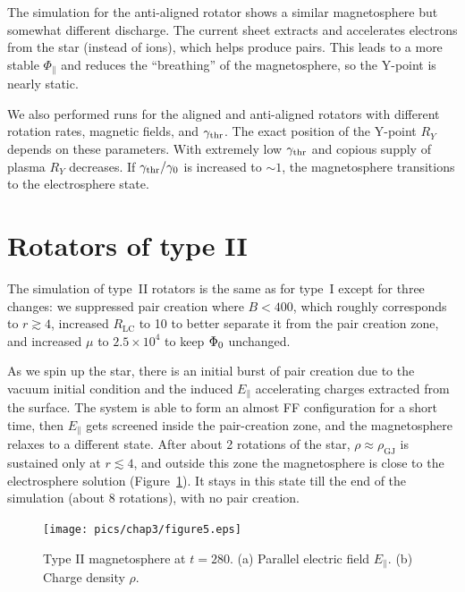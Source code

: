 The simulation for the anti-aligned rotator shows a similar magnetosphere
but somewhat different discharge.
The current sheet extracts
and accelerates electrons from the star
(instead of ions), which helps
produce pairs. This leads to a more stable $\Phi_\parallel$
and reduces the ``breathing'' of the magnetosphere, so the Y-point is nearly static.

We also performed runs for the aligned and anti-aligned rotators with
different rotation rates, magnetic fields, and $\gamma_{\rm thr}$. The exact
position of the Y-point $R_Y$ depends on these parameters.
With extremely low $\gamma_{\rm thr}$ and copious supply of plasma $R_Y$ decreases.
If $\gamma_{\rm thr}/\gamma_0$ is increased to $\sim 1$,
the magnetosphere transitions to the electrosphere state.


\section{Rotators of type II}

The simulation of type~II rotators is the same as for type~I except for three changes:
we suppressed pair creation where $B<400$, which roughly corresponds to $r\gtrsim 4$,
increased $R_\mathrm{LC}$ to 10 to better separate it from the pair creation zone,
and increased $\mu$ to $2.5\times 10^4$ to keep $\Phi_0$ unchanged.


As we spin up the star, there is an initial burst of pair creation due to the
vacuum initial condition and the induced $E_\parallel$ accelerating
charges extracted from the surface. The system is able to form an almost FF
configuration for a short time, then $E_\parallel$ gets screened inside the
pair-creation zone, and the magnetosphere relaxes to a different state.
After about 2 rotations of the star, $\rho\approx\rho_\mathrm{GJ}$ is sustained only at $r\lesssim 4$,
and outside this zone the magnetosphere is close to the electrosphere solution
(Figure~\ref{fig:type2}). It stays in this state till the end of the simulation
(about 8 rotations), with no pair creation.

\begin{figure}[t]
    \centering
    \texttt{[image: pics/chap3/figure5.eps]}
    \caption[Magnetosphere of type II aligned rotator]{\small
    Type II magnetosphere at $t=280$.
    (a) Parallel electric field $E_{\parallel}$.
    (b) Charge density $\rho$.
    }
   \label{fig:type2}
\end{figure}

